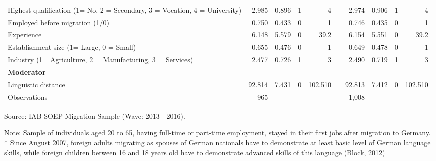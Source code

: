 \documentclass[12pt,a4paper]{article}
\begin{document}
\begin{center}
\begin{table}[htbp]
{\begin{tabular}{lrrrrrrrrr}
    \multicolumn{1}{p{19.7em}}{Highest qualification (1= No, 2 = Secondary, 3 = Vocation, 4 = University)} & 2.985 & 0.896 & 1     & 4     &       & 2.974 & 0.906 & 1     & 4 \\
    Employed before migration (1/0) & 0.750 & 0.433 & 0     & 1     &       & 0.746 & 0.435 & 0     & 1 \\
    Experience & 6.148 & 5.579 & 0     & 39.2 &       & 6.154 & 5.551 & 0     & 39.2 \\
    Establishment size (1= Large, 0 = Small) & 0.655 & 0.476 & 0     & 1     &       & 0.649 & 0.478 & 0     & 1 \\
    \multicolumn{1}{p{19.7em}}{Industry (1= Agriculture, 2 = Manufacturing, 3 = Services)} & 2.477 & 0.726 & 1     & 3     &       & 2.490 & 0.719 & 1     & 3 \\
    \multicolumn{1}{p{19.7em}}{\textbf{Moderator}} &       &       &       &       &       &       &       &       &  \\
    Linguistic distance & 92.814 & 7.431 & 0     & 102.510 &       & 92.813 & 7.412 & 0     & 102.510 \\
    \midrule
    Observations & 965   &       &       &       &       & 1,008 &       &       &  \\
    \bottomrule
    \end{tabular}%
}
 \begin{tablenotes}
      \small
      \item Source: IAB-SOEP Migration Sample (Wave: 2013 - 2016). 
      \item Note: Sample of individuals aged 20 to 65, having full-time or part-time employment, stayed in their first jobs after migration to Germany. * Since August 2007, foreign adults migrating as spouses of German nationals have to demonstrate at least basic level of German language skills, while foreign children between 16 and 18 years old have to demonstrate advanced skills of this language (Block, 2012)
    \end{tablenotes}
\end{table}%
\end{center}
\end{document}
